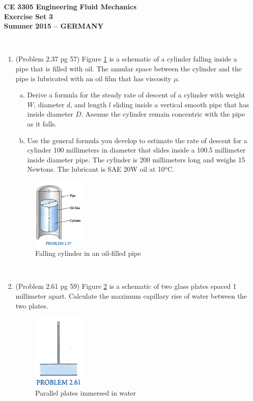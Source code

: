 \documentclass[12pt]{article}
\begin{document}
\begingroup
\begin{center}
{\textbf{{ CE 3305 Engineering Fluid Mechanics} \\ Exercise Set 3 \\ Summer 2015 -- GERMANY} }
\end{center}
\endgroup
\begingroup
~\newline

\begin{enumerate}
\item (Problem 2.37 pg 57)
Figure \ref{fig:FallingCylinderViscosity} is a schematic of a cylinder falling inside a pipe that is filled with oil.
The annular space between the cylinder and the pipe is lubricated with an oil film that has viscosity $\mu$.
\begin{enumerate}[a)]
\item Derive a formula for the steady rate of descent of a cylinder with weight $W$, diameter $d$, and length $l$ sliding inside a vertical smooth pipe that has inside diameter $D$.
Assume the cylinder remain concentric with the pipe as it falls.
\item Use the general formula you develop to estimate the rate of descent for a cylinder 100 millimeters in diameter that slides inside a 100.5 millimeter inside diameter pipe. 
The cylinder is 200 millimeters long and weighs 15 Newtons.  The lubricant is SAE 20W oil at 10$^o$C.
\end{enumerate}
\begin{figure}[htbp] %
   \centering
   \includegraphics[width=1in]{FallingCylinderViscosity.jpg} 
   \caption{Falling cylinder in an oil-filled pipe}
   \label{fig:FallingCylinderViscosity}
\end{figure}
\clearpage
~
\clearpage
\item (Problem 2.61 pg 59)
Figure \ref{fig:ParallelPlates} is a schematic of two glass plates spaced 1 millimeter apart.  
Calculate the maximum capillary rise of water between the two plates. 
\begin{figure}[htbp] %
   \centering
   \includegraphics[width=1in]{ParallelPlates.jpg} 
   \caption{Parallel plates immersed in water}
   \label{fig:ParallelPlates}
\end{figure}

\end{enumerate}
\end{document}
